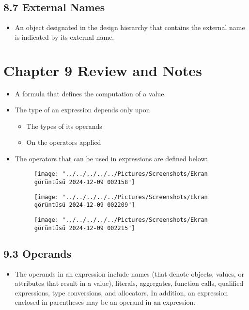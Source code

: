 \documentclass[a4paper,12pt]{article}
\begin{document}
	\subsection*{8.7 External Names}
	\begin{itemize}
		\item An object designated in the design hierarchy that contains the external name is indicated by its external name.
	\end{itemize}
	
	
	\section*{Chapter 9 Review and Notes}
	\begin{itemize}
		\item A formula that defines the computation of a value.
		\item The type of an expression depends only upon 
		\begin{itemize}
			\item The types of its operands 
			\item On the operators applied
		\end{itemize}
		\item The operators that can be used in expressions are defined below:
		
		\begin{figure}
			\centering
			\texttt{[image: "../../../../../Pictures/Screenshots/Ekran görüntüsü 2024-12-09 002158"]}
			\caption{}
			\label{fig:ekran-goruntusu-2024-12-09-002158}
		\end{figure}
		\begin{figure}
			\centering
			\texttt{[image: "../../../../../Pictures/Screenshots/Ekran görüntüsü 2024-12-09 002209"]}
			\caption{}
			\label{fig:ekran-goruntusu-2024-12-09-002209}
		\end{figure}
		\begin{figure}
			\centering
			\texttt{[image: "../../../../../Pictures/Screenshots/Ekran görüntüsü 2024-12-09 002215"]}
			\caption{}
			\label{fig:ekran-goruntusu-2024-12-09-002215}
		\end{figure}	
	\end{itemize}
	
	\subsection*{9.3 Operands}
	\begin{itemize}
		\item The operands in an expression include names (that denote objects, values, or attributes that result in a value),
		literals, aggregates, function calls, qualified expressions, type conversions, and allocators. In addition, an
		expression enclosed in parentheses may be an operand in an expression.
	\end{itemize}
	
\end{document}
